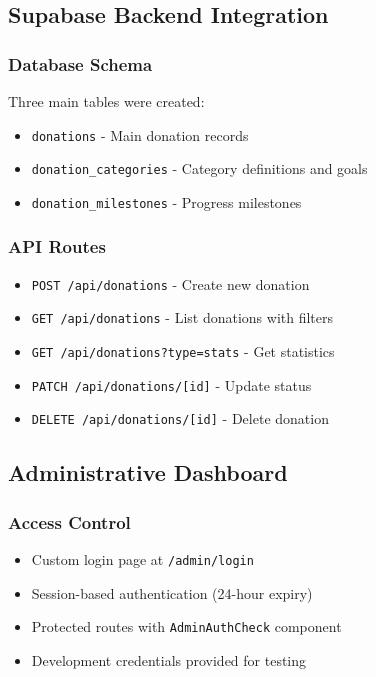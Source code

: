 \documentclass[11pt,a4paper]{article}
\begin{document}
\subsection{Supabase Backend Integration}
\subsubsection{Database Schema}
Three main tables were created:
\begin{itemize}[leftmargin=*,itemsep=3pt]
    \item \texttt{donations} - Main donation records
    \item \texttt{donation\_categories} - Category definitions and goals
    \item \texttt{donation\_milestones} - Progress milestones
\end{itemize}

\subsubsection{API Routes}
\begin{itemize}[leftmargin=*,itemsep=3pt]
    \item \texttt{POST /api/donations} - Create new donation
    \item \texttt{GET /api/donations} - List donations with filters
    \item \texttt{GET /api/donations?type=stats} - Get statistics
    \item \texttt{PATCH /api/donations/[id]} - Update status
    \item \texttt{DELETE /api/donations/[id]} - Delete donation
\end{itemize}

\subsection{Administrative Dashboard}
\subsubsection{Access Control}
\begin{itemize}[leftmargin=*,itemsep=3pt]
    \item Custom login page at \texttt{/admin/login}
    \item Session-based authentication (24-hour expiry)
    \item Protected routes with \texttt{AdminAuthCheck} component
    \item Development credentials provided for testing
\end{itemize}
\end{document}
